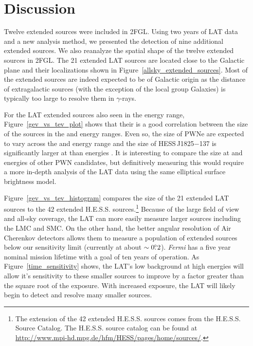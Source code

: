 \documentclass[12pt,preprint]{aastex}
\newcommand{\gev}{\text{GeV}\xspace}
\newcommand{\tev}{\text{TeV}\xspace}
\newcommand{\fermi}{\textit{Fermi}\xspace}
\newcommand{\hl}[1]{#1}
\begin{document}
\section{Discussion}

\hl{
Twelve extended sources were included in 2FGL.  Using two years of
LAT data and a new analysis method, we presented the detection of
nine additional extended sources. We also reanalyze the spatial
shape of the twelve extended sources in 2FGL.  The 21 extended
LAT sources are located close to the Galactic plane 
and their localizations shown in
Figure~\ref{allsky_extended_sources}.  Most of the extended sources are
indeed expected to be of Galactic origin as the distance of extragalactic
sources (with the exception of the local group Galaxies) is typically too
large to resolve them in $\gamma$-rays.

For the LAT extended sources also seen in the \tev energy range,
Figure~\ref{gev_vs_tev_plot} shows that their is a good correlation
between the size of the sources in the \gev and \tev energy ranges. Even
so, the size of PWNe are expected to vary across the \gev and \tev
energy range and the size of HESS\,J1825$-$137 is significantly larger at
\gev than \tev energies \citep{fermi_hess_j1825}.  It is interesting to
compare the size at \gev and \tev energies
of other PWN candidates, but definitively
measuring this would require a more in-depth analysis of the LAT data
using the same elliptical surface brightness model.

Figure~\ref{gev_vs_tev_histogram} compares the size of the 21 extended
LAT sources to the 42 extended H.E.S.S. sources.\footnote{The 
\tev extension of
the 42 extended H.E.S.S. sources comes from the H.E.S.S. Source
Catalog. The H.E.S.S. source catalog can be found at \url{http://www.mpi-hd.mpg.de/hfm/HESS/pages/home/sources/}.}
Because of the large
field of view and all-sky coverage, the LAT can more easily measure
larger sources including the LMC and SMC.  On the other hand, the 
better
angular resolution of Air Cherenkov detectors allows them to measure a
population of extended sources below our sensitivity limit (currently at
about $\sim0\mbox{$.\!\!^\circ$}2$).  \fermi has a five year nominal mission lifetime with
a goal of ten years of operation.  As Figure~\ref{time_sensitivity} shows,
the LAT's low background at high energies will allow it's sensitivity to
these smaller sources to improve by a factor greater than the square root
of the exposure.  With increased exposure, the LAT will likely begin to
detect and resolve many smaller \tev sources.

}
\end{document}
